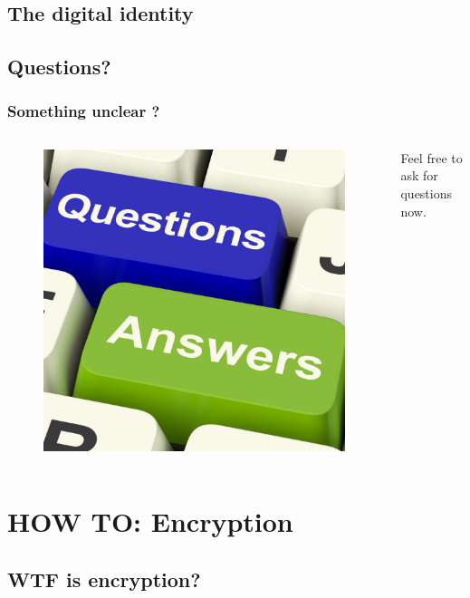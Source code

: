 \documentclass{beamer}
\begin{document}
\subsection{The digital identity}
\begin{frame}
\end{frame}

\subsection{Questions?}
\begin{frame}
\frametitle{Something unclear ?}
\begin{columns}[c]
\begin{figure}
\includegraphics[width=0.8\linewidth]{./materials/questions}
\end{figure}
Feel free to ask for questions now.
\end{columns}
\end{frame}

\section{HOW TO: Encryption}
\subsection{WTF is encryption?}
\begin{frame}
\end{frame}
\end{document}
